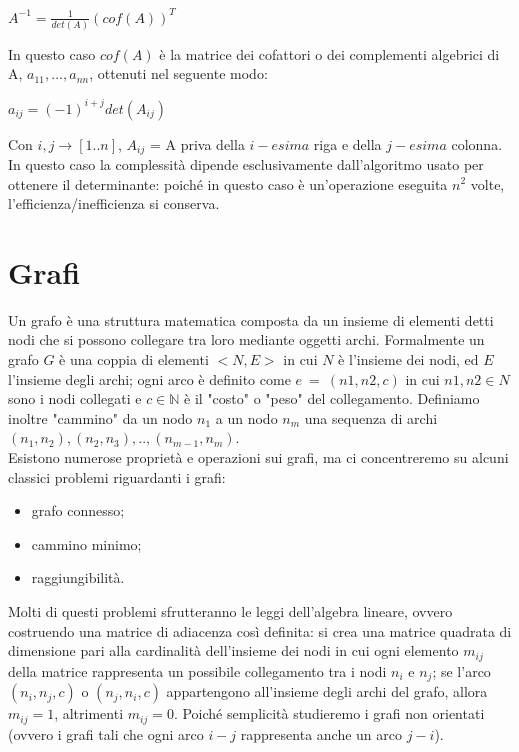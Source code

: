 \begin{center}
{$A^{-1} = \frac{1}{det(A)}(cof(A))^T$\\}
\end{center}
In questo caso $cof(A)$ è la matrice dei cofattori o dei complementi algebrici di A, $a_{11}, ..., a_{nn}$, ottenuti nel seguente modo:
\begin{center}
{$a_{ij} = (-1)^{i+j} det(A_{ij})$ \\}
\end{center}
Con $i,j\rightarrow[1..n]$, $A_{ij}$ = A priva della $i-esima$ riga e della $j-esima$ colonna.\\
In questo caso la complessità dipende esclusivamente dall'algoritmo usato per ottenere il determinante: poiché in questo caso è un'operazione eseguita $n^2$ volte, l'efficienza/inefficienza si conserva.
\section{Grafi}
Un grafo è una struttura matematica composta da un insieme di elementi detti nodi che si possono collegare tra loro mediante oggetti archi. Formalmente un grafo $G$ è una coppia di elementi $<N, E>$ in cui $N$ è l'insieme dei nodi, ed $E$ l'insieme degli archi; ogni arco è definito come $e \ = \ (n1,n2,c)$ in cui $n1,n2 \in N$ sono i nodi collegati e $c \in \mathbb{N}$ è il "costo" o "peso" del collegamento. Definiamo inoltre "cammino" da un nodo $n_1$ a un nodo $n_m$ una sequenza di archi $(n_1,n_2),(n_2,n_3),..,(n_{m-1}, n_m)$.\\
Esistono numerose proprietà e operazioni sui grafi, ma ci concentreremo su alcuni classici problemi riguardanti i grafi:
\begin{itemize}
\item{grafo connesso;}
\item{cammino minimo;}
\item{raggiungibilità.}
\end{itemize}
Molti di questi problemi sfrutteranno le leggi dell'algebra lineare, ovvero costruendo una matrice di adiacenza così definita: si crea una matrice quadrata di dimensione pari alla cardinalità dell'insieme dei nodi in cui ogni elemento $m_{ij}$ della matrice rappresenta un possibile collegamento tra i nodi $n_i$ e $n_j$; se l'arco $(n_i,n_j,c)$ o $(n_j,n_i,c)$ appartengono all'insieme degli archi del grafo, allora $m_{ij} = 1$, altrimenti $m_{ij} = 0$. Poiché semplicità studieremo i grafi non orientati (ovvero i grafi tali che ogni arco $i-j$ rappresenta anche un arco $j-i$).\\
